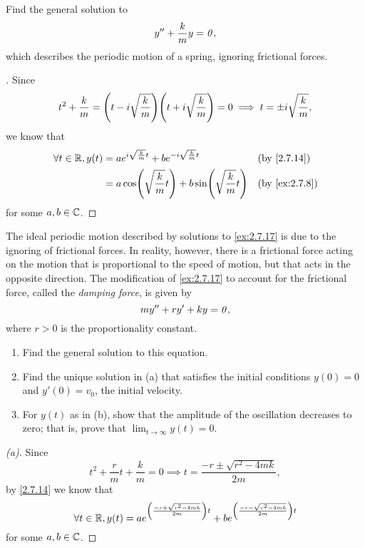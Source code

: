 \begin{ex}\label{ex:2.7.17}
	Find the general solution to
	\[
		y'' + \frac{k}{m} y = \mathit{0},
	\]
	which describes the periodic motion of a spring, ignoring frictional forces.
\end{ex}

\begin{proof}[]
	Since
	\[
		t^2 + \frac{k}{m} = \pa{t - i \sqrt{\frac{k}{m}}} \pa{t + i \sqrt{\frac{k}{m}}} = 0 \implies t = \pm i \sqrt{\frac{k}{m}},
	\]
	we know that
	\begin{align*}
		\forall t \in \R, y(t) & = a e^{i \sqrt{\frac{k}{m}} t} + b e^{-i \sqrt{\frac{k}{m}} t}      &  & \by{2.7.14}   \\
		                       & = a \cos\pa{\sqrt{\frac{k}{m}} t} + b \sin\pa{\sqrt{\frac{k}{m}} t} &  & \by{ex:2.7.8}
	\end{align*}
	for some \(a, b \in \mathbb{C}\).
\end{proof}

\begin{ex}\label{ex:2.7.18}
	The ideal periodic motion described by solutions to \cref{ex:2.7.17} is due to the ignoring of frictional forces.
	In reality, however, there is a frictional force acting on the motion that is proportional to the speed of motion, but that acts in the opposite direction.
	The modification of \cref{ex:2.7.17} to account for the frictional force, called the \emph{damping force}, is given by
	\[
		m y'' + r y' + ky = \mathit{0},
	\]
	where \(r > 0\) is the proportionality constant.
	\begin{enumerate}
		\item Find the general solution to this equation.
		\item Find the unique solution in (a) that satisfies the initial conditions \(y(0) = 0\) and \(y'(0) = v_0\), the initial velocity.
		\item For \(y(t)\) as in (b), show that the amplitude of the oscillation decreases to zero;
		      that is, prove that \(\lim_{t \to \infty} y(t) = 0\).
	\end{enumerate}
\end{ex}

\begin{proof}[(a)]
	Since
	\[
		t^2 + \frac{r}{m} t + \frac{k}{m} = 0 \implies t = \frac{-r \pm \sqrt{r^2 - 4mk}}{2m},
	\]
	by \cref{2.7.14} we know that
	\[
		\forall t \in \mathbb{R}, y(t) = a e^{\left\lparen\frac{-r + \sqrt{r^2 - 4mk}}{2m}\right\rparen t} + b e^{\left\lparen\frac{-r - \sqrt{r^2 - 4mk}}{2m}\right\rparen t}
	\]
	for some \(a, b \in \mathbb{C}\).
\end{proof}

